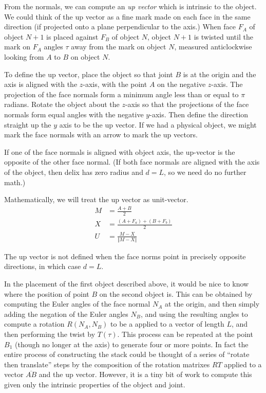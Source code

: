 \documentclass[11pt]{article}
\begin{document}
From the normals, we can compute an {\em up vector} which is intrinsic to the object.
We could think of the up vector as a fine mark made on each face in the same direction
(if projected onto a plane perpendicular to the axis.) When face $F_A$ of object $N+1$
is placed against $F_B$ of object $N$, object $N+1$ is twisted until the mark on $F_A$ angles
$\tau$ away from the mark on object $N$, measured anticlockwise looking from $A$ to $B$ on
object $N$.

To define the up vector, place the object so that joint $B$ is at the origin and the
axis is aligned with the $z$-axis, with the point $A$ on the negative $z$-axis.
The projection of the face normals form a minimum angle less than or equal to $\pi$
radians. Rotate the object about the $z$-axis so that the projections of the face normals
form equal angles with the negative $y$-axis. Then define the direction straight up
the $y$ axis to be the up vector. If we had a physical object, we might mark the face
normals with an arrow to mark the up vectors.

If one of the face normals is aligned with object axis, the up-vector is the opposite
of the other face normal. (If both face normals are aligned with the axis of the object,
then delix has zero radius and $d = L$, so we need do no further math.)

Mathematically, we will treat the up vector as unit-vector.
\begin{align}
  M &= \frac{A+B}{2} \\
  X &= \frac{(A+F_a) + (B+F_b)}{2} \\
  U &= \frac{M - X}{\Vert M - X \Vert}
\end{align}

The up vector is not defined when the face norms point in precisely opposite directions,
in which case $d = L$.

In the placement of the first object described above, it would
be nice to know where the position of point $B$ on the second
object is. This can be obtained by computing the Euler angles
of the face normal $N_A$ at the origin, and then simply
adding the negation of the Euler angles $N_B$, and using
the resulting angles to compute a rotation $R(N_A,N_B)$ to be a applied to
a vector of length $L$, and then performing the twist by $T(\tau)$. This process can be repeated at
the point $B_1$ (though no longer at the axis) to generate
four or more points. In fact the entire process of constructing
the stack could be thought of a series of ``rotate then translate'' steps by the composition of the rotation matrixes $RT$ applied to a vector $\overline{AB}$ and the up vector.
However, it is a tiny bit of work to compute this given only
the intrinsic properties of the object and joint.
\end{document}

